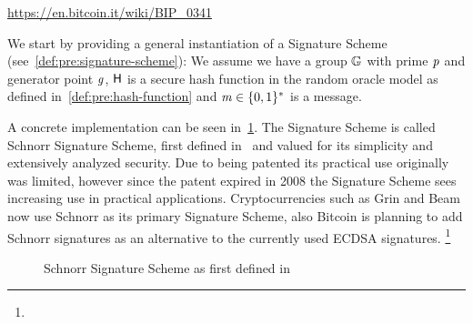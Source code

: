\urldef\urlbiptaproot\url{https://en.bitcoin.it/wiki/BIP_0341}

We start by providing a general instantiation of a Signature Scheme (see~\cref{def:pre:signature-scheme}):
We assume we have a group $\mathbb{G}$ with prime $\mathit{p}$ and generator point $\mathit{g}$, $\mathsf{H}$ is a secure hash function in the random oracle model as defined in~\cref{def:pre:hash-function} and $\mathit{m} \in \{0,1\}^{*}$ is a message.


A concrete implementation can be seen in~\cref{fig:schnorr}.
The Signature Scheme is called Schnorr Signature Scheme, first defined in~\cite{schnorr1989efficient} and valued for its simplicity and extensively analyzed security.
Due to being patented its practical use originally was limited, however since the patent expired in 2008 the Signature Scheme sees increasing use in practical applications.
Cryptocurrencies such as Grin and Beam now use Schnorr as its primary Signature Scheme, also Bitcoin is planning to add Schnorr signatures as an alternative to the currently used ECDSA signatures. \footnote{\urlbiptaproot}
\begin{figure}
    \begin{center}
        \fbox{
        \begin{varwidth}{\textwidth}
            \procedure[linenumbering]{$\procSetup{\varSecParam}$} {
            \varKey \sample \cnstIntegersPrimeWithoutZero{\varPrime} \\
            \pcreturn (\varSecKey \opAssign \varKey \opSeperate \varPubKey \opAssign \funGen{\varKey})
            }
            \procedure[linenumbering]{$\procSign{\varMsg}{\varSecKey}$}{
            \varNonce \sample \cnstIntegersPrimeWithoutZero{\varPrime} \\
            \varRand \opAssign \funGen{\varNonce} \\
            \varSchnorrChallenge \opAssign \funHash{\varMsg \opConc \varRand \opConc \varPubKey} \\
            \varS \opAssign \varNonce \opAddScalar \varSchnorrChallenge \opTimesScalar \varSecKey \\
            \pcreturn \varSignature \opAssign (\varS, \varRand)
            }
            \procedure[linenumbering]{$\procVerf{\varMsg}{\varSignature}{\varPubKey}$} {
            (\varS \opSeperate \varRand) \opFunResult \varSignature \\
            \varSchnorrChallenge \opAssign \funHash{\varMsg \opConc \varRand \opConc \varPubKey} \\
            \pcreturn \funGen{\varS} \opEqNoQ \varRand \opAddPoint \opPointScalar{\varPubKey}{\varSchnorrChallenge}
            }
        \end{varwidth}
        }
    \end{center}
    \caption{Schnorr Signature Scheme as first defined in~\cite{schnorr1989efficient}}
    \label{fig:schnorr}
\end{figure}


